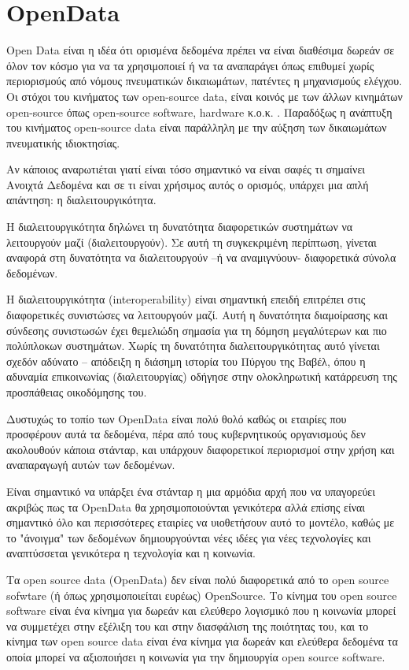 \chapter{OpenData}

Open Data είναι η ιδέα ότι ορισμένα δεδομένα πρέπει να είναι διαθέσιμα δωρεάν σε όλον τον κόσμο για να τα χρησιμοποιεί ή να τα αναπαράγει όπως επιθυμεί χωρίς περιορισμούς από νόμους πνευματικών δικαιωμάτων, πατέντες η μηχανισμούς ελέγχου. Οι στόχοι του κινήματος των open-source data, είναι κοινός με των άλλων κινημάτων open-source όπως open-source software, hardware κ.ο.κ. \citep{wiki:opendata}.
Παραδόξως η ανάπτυξη του κινήματος open-source data είναι παράλληλη με την αύξηση των δικαιωμάτων πνευματικής ιδιοκτησίας.

Αν κάποιος αναρωτιέται γιατί είναι τόσο σημαντικό να είναι σαφές τι σημαίνει Ανοιχτά Δεδομένα και σε τι είναι χρήσιμος αυτός ο ορισμός, υπάρχει μια απλή απάντηση: η διαλειτουργικότητα.

Η διαλειτουργικότητα δηλώνει τη δυνατότητα διαφορετικών συστημάτων να λειτουργούν μαζί (διαλειτουργούν). Σε αυτή τη συγκεκριμένη περίπτωση, γίνεται αναφορά στη δυνατότητα να διαλειτουργούν –ή να αναμιγνύουν- διαφορετικά σύνολα δεδομένων.

Η διαλειτουργικότητα (interoperability) είναι σημαντική επειδή επιτρέπει στις διαφορετικές συνιστώσες να λειτουργούν μαζί. Αυτή η δυνατότητα διαμοίρασης και σύνδεσης συνιστωσών έχει θεμελιώδη σημασία για τη δόμηση μεγαλύτερων και πιο πολύπλοκων συστημάτων. Χωρίς τη δυνατότητα διαλειτουργικότητας αυτό γίνεται σχεδόν αδύνατο – απόδειξη η διάσημη ιστορία του Πύργου της Βαβέλ, όπου η αδυναμία επικοινωνίας (διαλειτουργίας) οδήγησε στην ολοκληρωτική κατάρρευση της προσπάθειας οικοδόμησης του. \citep{github:opendata}

Δυστυχώς το τοπίο των OpenData είναι πολύ θολό καθώς οι εταιρίες που προσφέρουν αυτά τα δεδομένα, πέρα από τους κυβερνητικούς οργανισμούς δεν ακολουθούν κάποια στάνταρ, και υπάρχουν διαφορετικοί περιορισμοί στην χρήση και αναπαραγωγή αυτών των δεδομένων. 

Είναι σημαντικό να υπάρξει ένα στάνταρ η μια αρμόδια αρχή που να υπαγορεύει ακριβώς πως τα OpenData θα χρησιμοποιούνται γενικότερα αλλά επίσης είναι σημαντικό όλο και περισσότερες εταιρίες να υιοθετήσουν αυτό το μοντέλο, καθώς με το "άνοιγμα" των δεδομένων δημιουργούνται νέες ιδέες για νέες τεχνολογίες και αναπτύσσεται γενικότερα η τεχνολογία και η κοινωνία.

Τα open source data (OpenData) δεν είναι πολύ διαφορετικά από το open source sofwtare (ή όπως χρησιμοποιείται ευρέως) OpenSource. Το κίνημα του open source software είναι ένα κίνημα για δωρεάν και ελεύθερο λογισμικό που η κοινωνία μπορεί να συμμετέχει στην εξέλιξη του και στην διασφάλιση της ποιότητας του, και το κίνημα των open source data είναι ένα κίνημα για δωρεάν και ελεύθερα δεδομένα τα οποία μπορεί να αξιοποιήσει η κοινωνία για την δημιουργία open source software. 

